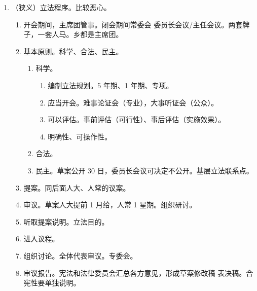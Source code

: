 \begin{enumerate}
\begin{enumerate}
                \begin{enumerate}
                  \item 自治条例、单行条例。自治区/州/县人大（没有乡）。排除宪、民族自治法、基本原则、专门规定。
                  \item 3 区。经济特区、浦东新区、海南自贸港区。\yi 基于全人大/人常授权。\er \ydy 法律。\san 冲突找人常。
                \end{enumerate}
          \item 授权总结。基本法、法律相对保留、民族 3 区、中央单独针对某些地方（）。新增。
        \end{enumerate}
  \item （狭义）立法程序。比较恶心。
        \begin{enumerate}
          \item 开会期间，主席团管事。闭会期间常委会 \yjt 委员长会议/主任会议。两套牌子，一套人马。乡都是主席团。
          \item 基本原则。科学、合法、民主。
                \begin{enumerate}
                  \item 科学。
                        \begin{enumerate}
                          \item 编制立法规划。5 年期、1 年期、专项。
                          \item 应当开会。难事论证会（专业），大事听证会（公众）。
                          \item 可以评估。事前评估（可行性）、事后评估（实施效果）。
                          \item 明确性、可操作性。
                        \end{enumerate}
                  \item 合法。
                  \item 民主。\yi 草案公开 30 日，委员长会议可决定不公开。\er 基层立法联系点。
                \end{enumerate}
          \item 提案。同后面人大、人常的议案。
          \item 审议。草案人大提前 1 月给，人常 1 星期。组织研讨。
          \item 听取提案说明。立法目的。
          \item 进入议程。
          \item 组织讨论。\yi 全体代表审议。\er 专委会。
          \item 审议报告。宪法和法律委员会汇总各方意见，形成草案修改稿 \yjt 表决稿。合宪性要单独说明。

\end{enumerate}
\end{enumerate}
